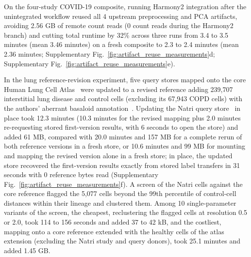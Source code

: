 On the four-study COVID-19 composite, running Harmony2 integration after the unintegrated workflow reused all 4 upstream preprocessing and PCA artifacts, avoiding 2.56 GB of remote count reads (0 count reads during the Harmony2 branch) and cutting total runtime by 32\% across three runs from 3.4 to 3.5 minutes (mean 3.46 minutes) on a fresh composite to 2.3 to 2.4 minutes (mean 2.36 minutes; Supplementary Fig.~\ref{fig:artifact_reuse_measurements}d; Supplementary Fig.~\ref{fig:artifact_reuse_measurements}e).

In the lung reference-revision experiment, five query stores mapped onto the core Human Lung Cell Atlas~\cite{sikkema2023} were updated to a revised reference adding 239,707  interstitial lung disease and control cells (excluding its 67,943 COPD cells) with the authors' aberrant basaloid annotation~\cite{adams2020}. Updating the Natri query store~\cite{natri2024} in place took 12.3 minutes (10.3 minutes for the revised mapping plus 2.0 minutes re-requesting stored first-version results, with 6 seconds to open the store) and added 61 MB, compared with 20.0 minutes and 157 MB for a complete rerun of both reference versions in a fresh store, or 10.6 minutes and 99 MB for mounting and mapping the revised version alone in a fresh store; in place, the updated store recovered the first-version results exactly from stored label transfers in 31 seconds with 0 reference bytes read (Supplementary Fig.~\ref{fig:artifact_reuse_measurements}f). A screen of the Natri cells against the core reference flagged the 5,077 cells beyond the 99th percentile of control-cell distances within their lineage and clustered them. Among 10 single-parameter variants of the screen, the cheapest, reclustering the flagged cells at resolution 0.5 or 2.0, took 114 to 156 seconds and added 37 to 42 kB, and the costliest, mapping onto a core reference extended with the healthy cells of the atlas extension (excluding the Natri study and query donors), took 25.1 minutes and added 1.45 GB.

